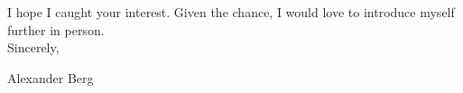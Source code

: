 \documentclass[../main.tex]{subfiles}
\begin{document}

I hope I caught your interest. Given the chance, I would love to introduce myself further in person.
\\

Sincerely, 

Alexander Berg
\end{document}
